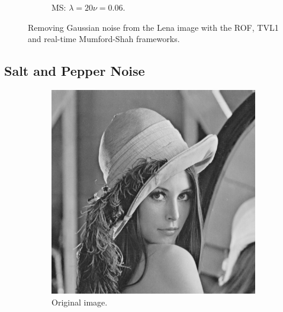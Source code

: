 \documentclass[abstracton]{scrreprt}
\begin{document}
\begin{figure}[!ht]
\begin{subfigure}[b]{0.244\textwidth}
                    \caption{MS: $\lambda = 20$\newline$\nu = 0.06$.}
                \end{subfigure}
                \caption[Removing Gaussian noise using the ROF, TVL1 and real-time Mumford-Shah framework.]{Removing Gaussian noise from the Lena image with the ROF, TVL1 and real-time Mumford-Shah frameworks.}
            \label{fig:denoising_lena_gauss}
            \end{figure}
        \subsection{Salt and Pepper Noise} %
        \label{sub:salt_and_pepper_noise}
            \begin{figure}[!ht]
                \centering
                \begin{subfigure}[b]{0.24\textwidth}
                    \includegraphics[width=\textwidth]{img/images/lena.png}
                    \caption{Original image.}
                \end{subfigure}
                \begin{subfigure}[b]{0.24\textwidth}

\end{subfigure}
\end{figure}
\end{document}
